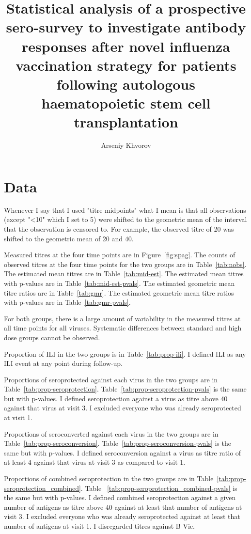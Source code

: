 \documentclass[11pt]{article}
\title{Statistical analysis of a prospective sero-survey to investigate
antibody responses
after novel influenza vaccination strategy
for patients following autologous
haematopoietic stem cell transplantation}
\author{Arseniy Khvorov}
\begin{document}
\maketitle

\section{Data}

Whenever I say that I used "titre midpoints" what I mean is that all
observations (except "<10" which I set to 5) were shifted to the geometric mean
of the interval that the observation is censored to. For example, the observed
titre of 20 was shifted to the geometric mean of 20 and 40.

Measured titres at the four time points are in Figure~\ref{fig:spag}.
The counts of observed titres at the four time points for the two groups are
in Table~\ref{tab:nobs}.
The estimated mean titres are in Table~\ref{tab:mid-est}.
The estimated mean titres with p-values are in Table~\ref{tab:mid-est-pvals}.
The estimated geometric mean titre ratios are in Table~\ref{tab:gmr}.
The estimated geometric mean titre ratios
with p-values are in Table~\ref{tab:gmr-pvals}.

For both groups, there is a large amount of variability in the measured titres
at all time points for all viruses. Systematic differences between standard and
high dose groups cannot be observed.

Proportion of ILI in the two groups is in Table~\ref{tab:prop-ili}.
I defined ILI as any ILI event at any point during follow-up.

Proportions of seroprotected against each virus
in the two groups are in
Table~\ref{tab:prop-seroprotection}.
Table~\ref{tab:prop-seroprotection-pvals} is the same but with p-values.
I defined seroprotection against a virus as titre above 40 against that virus
at visit 3. I excluded everyone who was already seroprotected at visit 1.

Proportions of seroconverted against each virus
in the two groups are in
Table~\ref{tab:prop-seroconversion}.
Table~\ref{tab:prop-seroconversion-pvals} is the same but with p-values.
I defined seroconversion against a virus as titre ratio of at least 4 against
that virus at visit 3 as compared to visit 1.

Proportions of combined seroprotection
in the two groups are in
Table~\ref{tab:prop-seroprotection_combined}.
Table ~\ref{tab:prop-seroprotection_combined-pvals}
is the same but with p-values.
I defined combined seroprotection against a given number of antigens
as titre above 40 against at least that number of antigens
at visit 3. I excluded everyone who was already seroprotected
against at least that number of antigens at visit 1.
I disregarded titres against B Vic.
\end{document}
